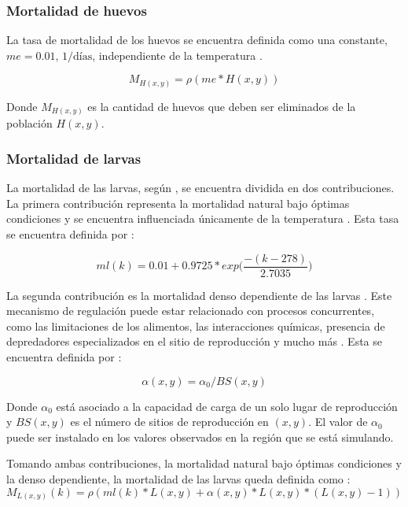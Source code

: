 \subsubsection{Mortalidad de huevos}
La tasa de mortalidad de los huevos se encuentra definida como una constante, $me = 0.01$,
$1/\text{días}$, independiente de la temperatura \cite{otero2006stochastic}.

\begin{equation}
    M_{H(x,y)} = \rho(me * H(x,y))
\end{equation}

Donde $M_{H(x,y)}$ es la cantidad de huevos que deben ser eliminados de la población $H(x,y)$.

\subsubsection{Mortalidad de larvas}
La mortalidad de las larvas, según \cite{otero2006stochastic}, se encuentra dividida en dos
contribuciones. La primera contribución representa la mortalidad natural bajo óptimas condiciones
y se encuentra influenciada únicamente de la temperatura \cite{otero2006stochastic}. Esta tasa se
encuentra definida por :

\begin{equation}
\label{eq:mortalidad-natural-larvas}
    ml(k) = 0.01 + 0.9725 * exp\bigg( \frac{-(k - 278)}{2.7035}\bigg)
\end{equation}

La segunda contribución es la mortalidad denso dependiente de las larvas \cite{otero2006stochastic}
. Este mecanismo de regulación puede estar relacionado con procesos concurrentes, como las
limitaciones de los alimentos, las interacciones químicas, presencia de depredadores
especializados en el sitio de reproducción y mucho más \cite{otero2006stochastic}. Esta se
encuentra definida por :

\begin{equation}
  \alpha (x,y) = \alpha _{0}/BS(x,y)
\end{equation}

Donde $\alpha _{0}$ está asociado a la capacidad de carga de un solo lugar de reproducción y
$BS(x,y)$ es el número de sitios de reproducción en $(x,y)$. El valor de $\alpha _{0}$ puede ser
instalado en los valores observados en la región que se está simulando.

Tomando ambas contribuciones, la mortalidad natural bajo óptimas condiciones y la denso
dependiente, la mortalidad de las larvas queda definida como :
\begin{equation}
    M_{L(x,y)}(k) = \rho(ml(k) * L(x,y) + \alpha (x,y) * L(x,y) *(L(x,y) - 1))
\end{equation}

